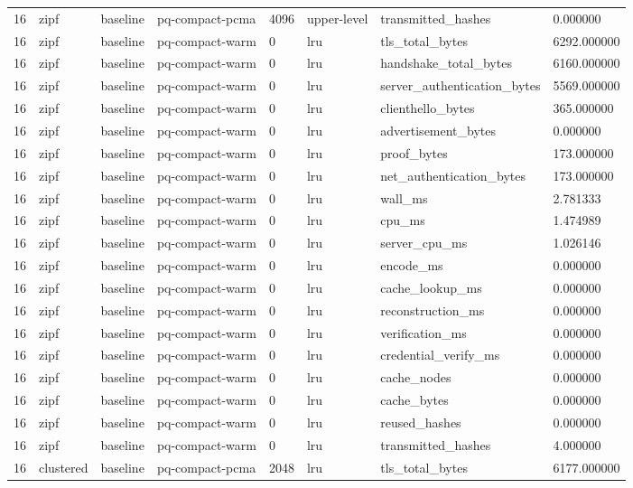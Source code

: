 \begin{tabular}{llllllll}
16 & zipf & baseline & pq-compact-pcma & 4096 & upper-level & transmitted\_hashes & 0.000000 \\
16 & zipf & baseline & pq-compact-warm & 0 & lru & tls\_total\_bytes & 6292.000000 \\
16 & zipf & baseline & pq-compact-warm & 0 & lru & handshake\_total\_bytes & 6160.000000 \\
16 & zipf & baseline & pq-compact-warm & 0 & lru & server\_authentication\_bytes & 5569.000000 \\
16 & zipf & baseline & pq-compact-warm & 0 & lru & clienthello\_bytes & 365.000000 \\
16 & zipf & baseline & pq-compact-warm & 0 & lru & advertisement\_bytes & 0.000000 \\
16 & zipf & baseline & pq-compact-warm & 0 & lru & proof\_bytes & 173.000000 \\
16 & zipf & baseline & pq-compact-warm & 0 & lru & net\_authentication\_bytes & 173.000000 \\
16 & zipf & baseline & pq-compact-warm & 0 & lru & wall\_ms & 2.781333 \\
16 & zipf & baseline & pq-compact-warm & 0 & lru & cpu\_ms & 1.474989 \\
16 & zipf & baseline & pq-compact-warm & 0 & lru & server\_cpu\_ms & 1.026146 \\
16 & zipf & baseline & pq-compact-warm & 0 & lru & encode\_ms & 0.000000 \\
16 & zipf & baseline & pq-compact-warm & 0 & lru & cache\_lookup\_ms & 0.000000 \\
16 & zipf & baseline & pq-compact-warm & 0 & lru & reconstruction\_ms & 0.000000 \\
16 & zipf & baseline & pq-compact-warm & 0 & lru & verification\_ms & 0.000000 \\
16 & zipf & baseline & pq-compact-warm & 0 & lru & credential\_verify\_ms & 0.000000 \\
16 & zipf & baseline & pq-compact-warm & 0 & lru & cache\_nodes & 0.000000 \\
16 & zipf & baseline & pq-compact-warm & 0 & lru & cache\_bytes & 0.000000 \\
16 & zipf & baseline & pq-compact-warm & 0 & lru & reused\_hashes & 0.000000 \\
16 & zipf & baseline & pq-compact-warm & 0 & lru & transmitted\_hashes & 4.000000 \\
16 & clustered & baseline & pq-compact-pcma & 2048 & lru & tls\_total\_bytes & 6177.000000 \\

\end{tabular}
